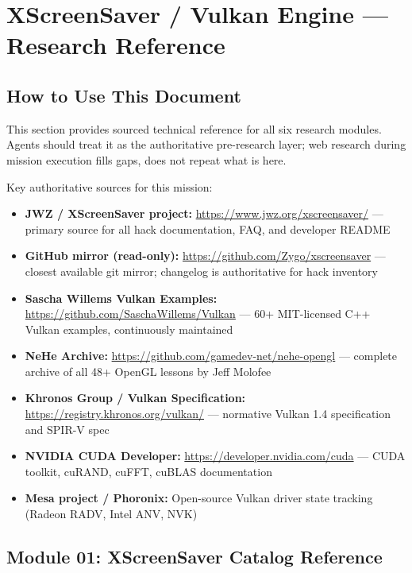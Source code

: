 \documentclass[11pt,letterpaper]{article}
\newcommand{\stageheader}[2]{%
  \noindent\colorbox{#2}{\makebox[\textwidth][l]{%
    \textcolor{white}{\bfseries\sffamily\hspace{6pt}#1\hspace{6pt}}}}%
  \vspace{0.5em}\par%
}
\begin{document}
\newpage
\stageheader{STAGE 2 --- RESEARCH REFERENCE}{secondary}

\section{XScreenSaver / Vulkan Engine --- Research Reference}

\subsection{How to Use This Document}

This section provides sourced technical reference for all six research modules. Agents should treat it as the authoritative pre-research layer; web research during mission execution fills gaps, does not repeat what is here.

Key authoritative sources for this mission:
\begin{itemize}
\item \textbf{JWZ / XScreenSaver project:} \url{https://www.jwz.org/xscreensaver/} --- primary source for all hack documentation, FAQ, and developer README
\item \textbf{GitHub mirror (read-only):} \url{https://github.com/Zygo/xscreensaver} --- closest available git mirror; changelog is authoritative for hack inventory
\item \textbf{Sascha Willems Vulkan Examples:} \url{https://github.com/SaschaWillems/Vulkan} --- 60+ MIT-licensed C++ Vulkan examples, continuously maintained
\item \textbf{NeHe Archive:} \url{https://github.com/gamedev-net/nehe-opengl} --- complete archive of all 48+ OpenGL lessons by Jeff Molofee
\item \textbf{Khronos Group / Vulkan Specification:} \url{https://registry.khronos.org/vulkan/} --- normative Vulkan 1.4 specification and SPIR-V spec
\item \textbf{NVIDIA CUDA Developer:} \url{https://developer.nvidia.com/cuda} --- CUDA toolkit, cuRAND, cuFFT, cuBLAS documentation
\item \textbf{Mesa project / Phoronix:} Open-source Vulkan driver state tracking (Radeon RADV, Intel ANV, NVK)
\end{itemize}

\subsection{Module 01: XScreenSaver Catalog Reference}
\end{document}
